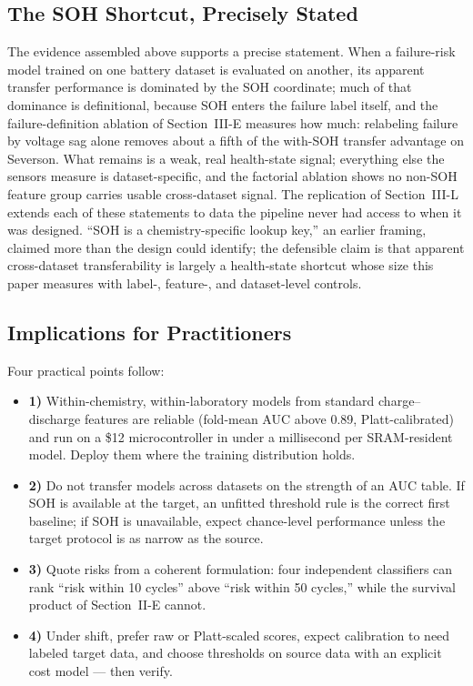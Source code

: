 \subsection{The SOH Shortcut, Precisely Stated}
The evidence assembled above supports a precise statement. When a failure-risk model trained on one battery dataset is evaluated on another, its apparent transfer performance is dominated by the SOH coordinate; much of that dominance is definitional, because SOH enters the failure label itself, and the failure-definition ablation of Section~III-E measures how much: relabeling failure by voltage sag alone removes about a fifth of the with-SOH transfer advantage on Severson. What remains is a weak, real health-state signal; everything else the sensors measure is dataset-specific, and the factorial ablation shows no non-SOH feature group carries usable cross-dataset signal. The replication of Section~III-L extends each of these statements to data the pipeline never had access to when it was designed. ``SOH is a chemistry-specific lookup key,'' an earlier framing, claimed more than the design could identify; the defensible claim is that apparent cross-dataset transferability is largely a health-state shortcut whose size this paper measures with label-, feature-, and dataset-level controls.

\subsection{Implications for Practitioners}
Four practical points follow:
\begin{itemize}
\item \textbf{1)} Within-chemistry, within-laboratory models from standard charge--discharge features are reliable (fold-mean AUC above 0.89, Platt-calibrated) and run on a \$12 microcontroller in under a millisecond per SRAM-resident model. Deploy them where the training distribution holds.
\item \textbf{2)} Do not transfer models across datasets on the strength of an AUC table. If SOH is available at the target, an unfitted threshold rule is the correct first baseline; if SOH is unavailable, expect chance-level performance unless the target protocol is as narrow as the source.
\item \textbf{3)} Quote risks from a coherent formulation: four independent classifiers can rank ``risk within 10 cycles'' above ``risk within 50 cycles,'' while the survival product of Section~II-E cannot.
\item \textbf{4)} Under shift, prefer raw or Platt-scaled scores, expect calibration to need labeled target data, and choose thresholds on source data with an explicit cost model --- then verify.
\end{itemize}

